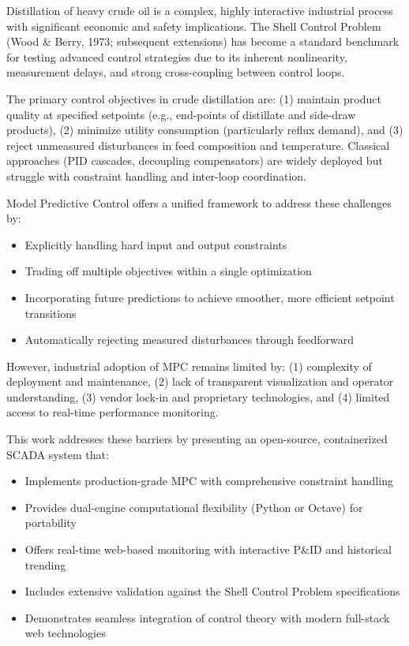 \documentclass[conference]{IEEEtran}
\begin{document}
Distillation of heavy crude oil is a complex, highly interactive industrial process with significant economic and safety implications. The Shell Control Problem (Wood \& Berry, 1973; subsequent extensions) has become a standard benchmark for testing advanced control strategies due to its inherent nonlinearity, measurement delays, and strong cross-coupling between control loops.

The primary control objectives in crude distillation are: (1) maintain product quality at specified setpoints (e.g., end-points of distillate and side-draw products), (2) minimize utility consumption (particularly reflux demand), and (3) reject unmeasured disturbances in feed composition and temperature. Classical approaches (PID cascades, decoupling compensators) are widely deployed but struggle with constraint handling and inter-loop coordination.

Model Predictive Control offers a unified framework to address these challenges by:
\begin{itemize}
\item Explicitly handling hard input and output constraints
\item Trading off multiple objectives within a single optimization
\item Incorporating future predictions to achieve smoother, more efficient setpoint transitions
\item Automatically rejecting measured disturbances through feedforward
\end{itemize}

However, industrial adoption of MPC remains limited by: (1) complexity of deployment and maintenance, (2) lack of transparent visualization and operator understanding, (3) vendor lock-in and proprietary technologies, and (4) limited access to real-time performance monitoring.

This work addresses these barriers by presenting an open-source, containerized SCADA system that:
\begin{itemize}
\item Implements production-grade MPC with comprehensive constraint handling
\item Provides dual-engine computational flexibility (Python or Octave) for portability
\item Offers real-time web-based monitoring with interactive P\&ID and historical trending
\item Includes extensive validation against the Shell Control Problem specifications
\item Demonstrates seamless integration of control theory with modern full-stack web technologies
\end{itemize}
\end{document}
